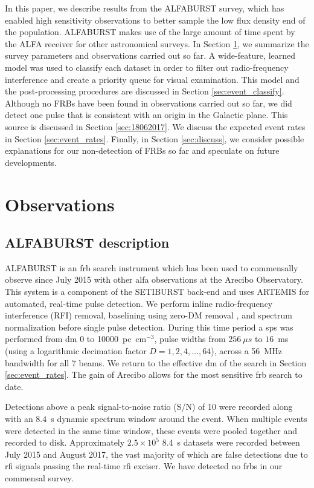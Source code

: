 \documentclass[a4paper,fleqn,usenatbib]{mnras}
\begin{document}
In this paper, we describe results from the ALFABURST survey, which has enabled
high sensitivity observations to better sample the low flux density end of the
population. ALFABURST makes use of the large amount of time spent by the ALFA
receiver for other astronomical surveys.  In Section \ref{sec:overview}, we
summarize the survey parameters and observations carried out so far.  A
wide-feature, learned model was used to classify each dataset in order to
filter out radio-frequency interference and create a priority queue for visual
examination. This model and the post-processing procedures are discussed in
Section \ref{sec:event_classify}.  Although no FRBs have been found in
observations carried out so far, we did detect one pulse that is consistent
with an origin in the Galactic plane. This source is discussed in Section
\ref{sec:18062017}. We discuss the expected event rates in Section
\ref{sec:event_rates}. Finally, in Section \ref{sec:discuss}, we consider
possible explanations for our non-detection of FRBs so far and speculate on
future developments.

\section{Observations}
\label{sec:overview}

\subsection{ALFABURST description}

ALFABURST is an \gls{frb} search instrument which has been used to commensally
observe since July 2015 with other \gls{alfa} observations at the Arecibo
Observatory. This system is a component of the SETIBURST back-end
\citep{2017ApJS..228...21C} and uses ARTEMIS \citep{2015MNRAS.452.1254K} for
automated, real-time pulse detection. We perform inline radio-frequency
interference (RFI) removal, baselining using zero-DM removal
\citep{2009MNRAS.395..410E}, and spectrum normalization before single pulse
detection. During this time period a \gls{sps} was performed from \gls{dm} 0 to
10000~pc~cm$^{-3}$, pulse widths from $256~\mu s$ to $16$~ms (using a logarithmic
decimation factor $D=1,2,4,\ldots,64$), across a 56~MHz bandwidth for
all 7 beams. We return to the effective \gls{dm} of the search in Section
\ref{sec:event_rates}. The gain of Arecibo allows for the most sensitive
\gls{frb} search to date.

Detections above a peak signal-to-noise ratio (S/N) of 10 were recorded along
with an $8.4$~s dynamic spectrum window around the event. When multiple events
were detected in the same time window, these events were pooled together and
recorded to disk.  Approximately $2.5 \times 10^5$ 8.4~s datasets were recorded
between July 2015 and August 2017, the vast majority of which are false
detections due to \gls{rfi} signals passing the real-time \gls{rfi} exciser. We
have detected no \glspl{frb} in our commensal survey.
\end{document}
